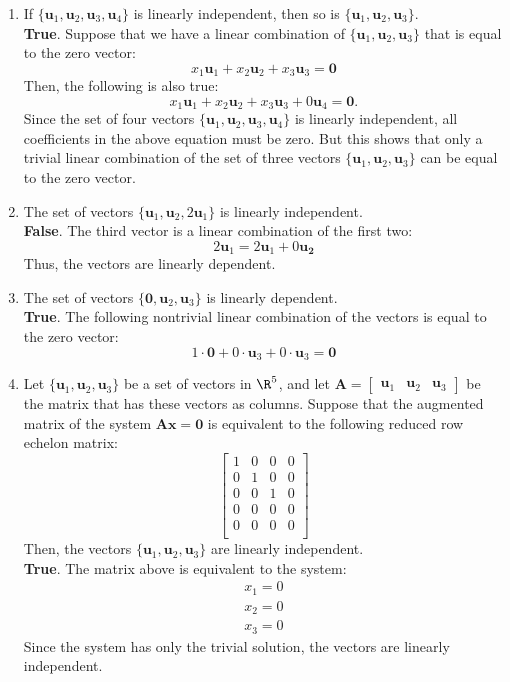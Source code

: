 \documentclass[12pt]{article}
\begin{document}
\begin{enumerate}
\item If $\{\mathbf{u}_1, \mathbf{u}_2, \mathbf{u}_3, \mathbf{u}_4\}$
is linearly independent, then so is $\{\mathbf{u}_1, \mathbf{u}_2, \mathbf{u}_3\}$.\\
\textbf{True}. Suppose that we have a linear combination of $\{\mathbf{u}_1, \mathbf{u}_2, \mathbf{u}_3\}$ that is equal to the zero vector:
\[
x_1\mathbf{u}_1+x_2\mathbf{u}_2+x_3\mathbf{u}_3=\mathbf{0}
\]
Then, the following is also true:
\[
x_1\mathbf{u}_1+x_2\mathbf{u}_2+x_3\mathbf{u}_3+0\mathbf{u}_4=\mathbf{0}.
\]
Since the set of four vectors $\{\mathbf{u}_1, \mathbf{u}_2, \mathbf{u}_3, \mathbf{u}_4\}$ is linearly independent, all coefficients in the above equation must be zero. But this shows that only a trivial linear combination of the set of three vectors $\{\mathbf{u}_1, \mathbf{u}_2, \mathbf{u}_3\}$ can be equal to the zero vector.

\item The set of vectors $\{\mathbf{u}_1, \mathbf{u}_2, 2\mathbf{u}_1\}$ is linearly independent.\\
\textbf{False}. The third vector is a linear combination of the first two:
\[
2\mathbf{u}_1=2\mathbf{u}_1+0\mathbf{u_2}
\]
Thus, the vectors are linearly dependent.

\item The set of vectors $\{\mathbf{0}, \mathbf{u}_2, \mathbf{u}_3\}$ is linearly dependent.\\
\textbf{True}. The following nontrivial linear combination of the vectors is equal to the zero vector:
\[
1\cdot\mathbf{0}+0\cdot\mathbf{u}_3+0\cdot\mathbf{u}_3=\mathbf{0}
\]

\item Let $\{\mathbf{u}_1, \mathbf{u}_2, \mathbf{u}_3\}$ be a set of vectors in $\R^5$, and let
$\mathbf{A}=[\begin{matrix} \mathbf{u}_1&\mathbf{u}_2&\mathbf{u}_3\end{matrix}]$ be the matrix that has these vectors as columns. 
Suppose that the augmented matrix of the system $\mathbf{A}\mathbf{x}=\mathbf{0}$ is equivalent to the following reduced row echelon matrix:
\[
\left[\begin{matrix}
1&0&0&0\\ 
0&1&0&0\\ 
0&0&1&0\\ 
0&0&0&0\\ 
0&0&0&0\\ 
\end{matrix}\right]
\]
Then, the vectors $\{\mathbf{u}_1, \mathbf{u}_2, \mathbf{u}_3\}$ are linearly independent.\\
\textbf{True}. The matrix above is equivalent to the system:
\[
\begin{matrix}
x_1=0\\x_2=0\\x_3=0
\end{matrix}
\]
Since the system has only the trivial solution, the vectors are linearly independent.


\end{enumerate}
\end{document}
